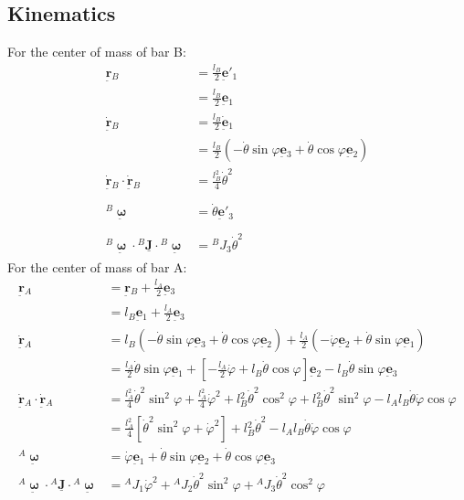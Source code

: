 \documentclass[12pt]{article}
\newcommand{\vb}[1]{{\underset{\tilde{}}{\mathbf{#1}}}}
\newcommand{\mb}[1]{\underline{\mathbf{#1}}}
\newcommand{\bomega}{\vb{\boldsymbol{\upomega}}}
\begin{document}
\subsection{Kinematics}
For the center of mass of bar B:
\begin{align*}
    \vb{r}{}_B &= \frac{l{}_B}{2} \vb{e}'{}_1 \\
             &= \frac{l{}_B}{2} \vb{e}{}_1 \\
    \dot{\vb{r}}{}_B &= \frac{l{}_B}{2} \dot{\vb{e}}{}_1 \\
             &= \frac{l{}_B}{2} (-\dot{\theta}\sin\varphi \vb{e}{}_3 + \dot{\theta}\cos\varphi \vb{e}{}_2) \\
    \dot{\vb{r}}{}_B \cdot \dot{\vb{r}}{}_B &= \frac{l{}_B^2}{4}\dot{\theta}^2 \\
    \\
    {}^B\bomega &= \dot{\theta} \vb{e}'{}_3 \\
    \\
    {}^B\bomega \cdot {}^B\mb{J} \cdot {}^B\bomega &= {}^B J{}_3 \dot{\theta}^2 
\end{align*}
For the center of mass of bar A:
\begin{align*}
    \vb{r}{}_A &= \vb{r}{}_B + \frac{l{}_A}{2} \vb{e}{}_3 \\
             &= l{}_B \vb{e}{}_1 + \frac{l{}_A}{2} \vb{e}{}_3 \\
    \dot{\vb{r}}{}_A &= l{}_B (-\dot{\theta}\sin\varphi \vb{e}{}_3 + \dot{\theta}\cos\varphi \vb{e}{}_2) + \frac{l{}_A}{2} (-\dot{\varphi}\vb{e}{}_2 + \dot{\theta}\sin\varphi \vb{e}{}_1) \\
             &= \frac{l{}_A}{2}\dot{\theta}\sin\varphi \vb{e}{}_1 + \left[ -\frac{l{}_A}{2}\dot{\varphi} + l{}_B \dot{\theta}\cos\varphi \right] \vb{e}{}_2 - l{}_B \dot{\theta}\sin\varphi \vb{e}{}_3 \\
    \dot{\vb{r}}{}_A \cdot \dot{\vb{r}}{}_A &= \frac{l{}_A^2}{4}\dot{\theta}^2\sin^2\varphi + \frac{l{}_A^2}{4}\dot{\varphi}^2 + l{}_B^2\dot{\theta}^2\cos^2\varphi + l{}_B^2\dot{\theta}^2\sin^2\varphi - l{}_A l{}_B \dot{\theta}\dot{\varphi}\cos\varphi \\
             &= \frac{l{}_A^2}{4}[\dot{\theta}^2\sin^2\varphi + \dot{\varphi}^2] + l{}_B^2\dot{\theta}^2 - l{}_A l{}_B \dot{\theta}\dot{\varphi}\cos\varphi \\
        {}^A\bomega &= \dot{\varphi} \vb{e}{}_1 + \dot{\theta}\sin\varphi \vb{e}{}_2 + \dot{\theta}\cos\varphi \vb{e}{}_3 \\
        {}^A\bomega \cdot {}^A\mb{J} \cdot {}^A\bomega &= {}^A J{}_1 \dot{\varphi}^2 + {}^A J{}_2 \dot{\theta}^2\sin^2\varphi + {}^A J{}_3 \dot{\theta}^2\cos^2\varphi
\end{align*}
\end{document}
